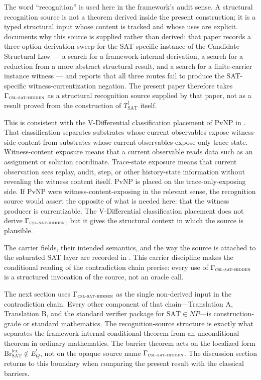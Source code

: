 \documentclass[11pt]{article}
\newcommand{\Tsat}{T^{!}_{\mathrm{SAT}}}
\newcommand{\EQbang}{E^{!}_{Q}}
\newcommand{\CSLSATHidden}{\Gamma_{\textsc{csl-sat-hidden}}}
\newcommand{\CSLcore}{Candidate Structural Law}
\newcommand{\VDiff}{V-Differential classification}
\theoremstyle{definition}
\begin{document}
The word ``recognition'' is used here in the framework's audit sense.
A structural recognition source is not a theorem derived inside the
present construction; it is a typed structural input whose content is
tracked and whose uses are explicit.  \citet{TsiokosHiddenness2026}
documents why this source is supplied rather than derived: that paper
records a three-option derivation sweep for the SAT-specific instance
of the \CSLcore{} — a search for a framework-internal derivation, a
search for a reduction from a more abstract structural result, and a
search for a finite-carrier instance witness — and reports that all
three routes fail to produce the SAT-specific witness-currentization
negation.  The present paper therefore takes \(\CSLSATHidden\) as a
structural recognition source supplied by that paper, not as a result
proved from the construction of \(\Tsat\) itself.

This is consistent with the \VDiff{} placement of PvNP in
\citet{TsiokosHiddenness2026}.  That classification separates
substrates whose current observables expose witness-side content from
substrates whose current observables expose only trace state.  Witness-content exposure means that a
current observable reads data such as an assignment or solution
coordinate.  Trace-state exposure means that current observation sees
replay, audit, step, or other history-state information without
revealing the witness content itself.  PvNP is placed on the
trace-only-exposing side.  If PvNP were witness-content-exposing in
the relevant sense, the recognition source would assert the opposite
of what is needed here: that the witness producer is currentizable.
The \VDiff{} placement does not derive \(\CSLSATHidden\), but it gives
the structural context in which the source is plausible.

The carrier fields, their intended semantics, and the way the source is
attached to the saturated SAT layer are recorded in
.  This carrier discipline makes
the conditional reading of the contradiction chain precise: every use
of \(\CSLSATHidden\) is a structured invocation of the source, not an
oracle call.

The next section uses \(\CSLSATHidden\) as the single non-derived
input in the contradiction chain.  Every other component of that
chain---Translation A, Translation B, and the standard verifier
package for \(\mathrm{SAT}\in NP\)---is construction-grade or standard
mathematics.  The recognition-source structure is exactly what
separates the framework-internal conditional theorem from an
unconditional theorem in ordinary mathematics.  The barrier theorem
acts on the localized form
\(\mathrm{Br}^{\mathrm{lex}}_{\mathrm{SAT}}\notin \EQbang\), not on the
opaque source name \(\CSLSATHidden\).  The discussion section returns
to this boundary when comparing the present result with the classical
barriers.
 
\end{document}
